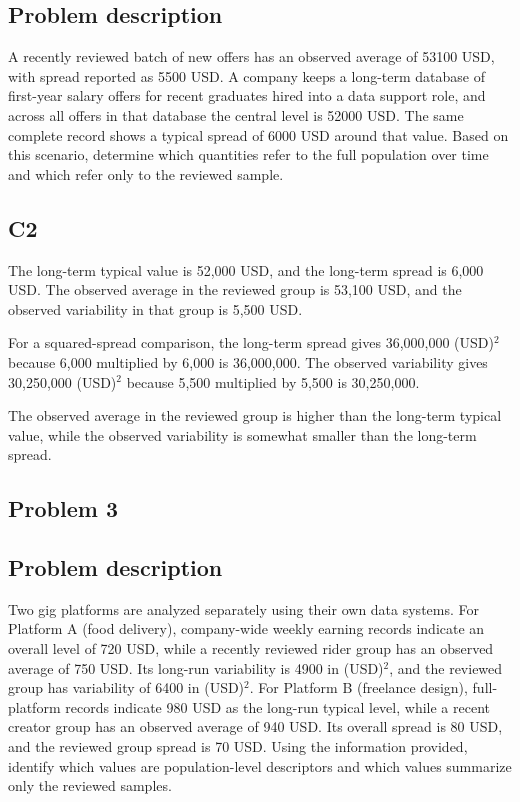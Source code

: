 \begin{ExamProblems}
		\subsection*{Problem description}
		A recently reviewed batch of new offers has an observed average of 53100 USD, with spread reported as 5500 USD.
		A company keeps a long-term database of first-year salary offers for recent graduates hired into a data support role, and across all offers in that database the central level is 52000 USD.
		The same complete record shows a typical spread of 6000 USD around that value.
		Based on this scenario, determine which quantities refer to the full population over time and which refer only to the reviewed sample.

\subsection*{C2}
		The long-term typical value is 52,000 USD, and the long-term spread is 6,000 USD.
		The observed average in the reviewed group is 53,100 USD, and the observed variability in that group is 5,500 USD.

		For a squared-spread comparison, the long-term spread gives 36,000,000 (USD)$^2$ because 6,000 multiplied by 6,000 is 36,000,000.
		The observed variability gives 30,250,000 (USD)$^2$ because 5,500 multiplied by 5,500 is 30,250,000.

		The observed average in the reviewed group is higher than the long-term typical value, while the observed variability is somewhat smaller than the long-term spread.


		\newpage
		\item
		\subsection*{Problem 3}
		\subsection*{Problem description}
		Two gig platforms are analyzed separately using their own data systems.
		For Platform A (food delivery), company-wide weekly earning records indicate an overall level of 720 USD, while a recently reviewed rider group has an observed average of 750 USD.
		Its long-run variability is 4900 in (USD)$^2$, and the reviewed group has variability of 6400 in (USD)$^2$.
		For Platform B (freelance design), full-platform records indicate 980 USD as the long-run typical level, while a recent creator group has an observed average of 940 USD.
		Its overall spread is 80 USD, and the reviewed group spread is 70 USD.
		Using the information provided, identify which values are population-level descriptors and which values summarize only the reviewed samples.


\end{ExamProblems}
